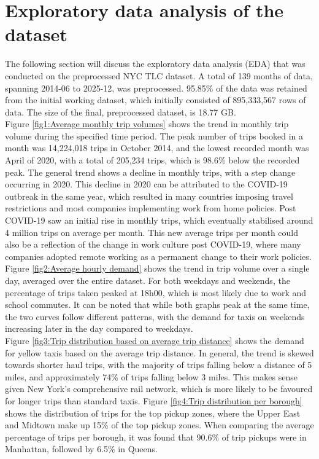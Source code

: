 \documentclass[conference]{IEEEtran}
\begin{document}
\section{Exploratory data analysis of the dataset}
The following section will discuss the exploratory data analysis (EDA) that was conducted on the preprocessed NYC TLC dataset. A total of 139 months of data, spanning 2014-06 to 2025-12, was preprocessed. 95.85\% of the data was retained from the initial working dataset, which initially consisted of 895,333,567 rows of data. The size of the final, preprocessed dataset, is 18.77 GB.\\

Figure \ref{fig1:Average monthly trip volumes} shows the trend in monthly trip volume during the specified time period. The peak number of trips booked in a month was 14,224,018 trips in October 2014, and the lowest recorded month was April of 2020, with a total of 205,234 trips, which is 98.6\% below the recorded peak. The general trend shows a decline in monthly trips, with a step change occurring in 2020. This decline in 2020 can be attributed to the COVID-19 outbreak in the same year, which resulted in many countries imposing travel restrictions and most companies implementing work from home policies. Post COVID-19 saw an initial rise in monthly trips, which eventually stabilised around 4 million trips on average per month. This new average trips per month could also be a reflection of the change in work culture post COVID-19, where many companies adopted remote working as a permanent change to their work policies.\\

Figure \ref{fig2:Average hourly demand} shows the trend in trip volume over a single day, averaged over the entire dataset. For both weekdays and weekends, the percentage of trips taken peaked at 18h00, which is most likely due to work and school commutes. It can be noted that while both graphs peak at the same time, the two curves follow different patterns, with the demand for taxis on weekends increasing later in the day compared to weekdays.\\

Figure \ref{fig3:Trip distribution based on average trip distance} shows the demand for yellow taxis based on the average trip distance. In general, the trend is skewed towards shorter haul trips, with the majority of trips falling below a distance of 5 miles, and approximately 74\% of trips falling below 3 miles. This makes sense given New York's comprehensive rail network, which is more likely to be favoured for longer trips than standard taxis. Figure \ref{fig4:Trip distribution per borough} shows the distribution of trips for the top pickup zones, where the Upper East and Midtown make up 15\% of the top pickup zones. When comparing the average percentage of trips per borough, it was found that 90.6\% of trip pickups were in Manhattan, followed by 6.5\% in Queens.\\ 
\end{document}
